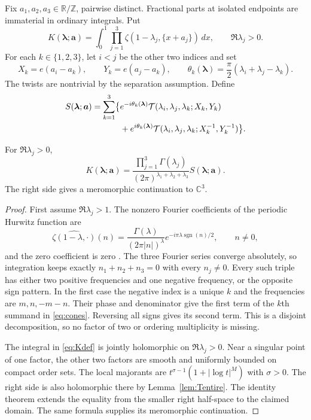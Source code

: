 Fix $a_1,a_2,a_3\in\mathbb R/\mathbb Z$, pairwise distinct.  Fractional
parts at isolated endpoints are immaterial in ordinary integrals.  Put
\begin{equation}\label{eq:Kdef}
 K(\boldsymbol\lambda;\boldsymbol a)
 =\int_0^1\prod_{j=1}^{3}
    \zeta(1-\lambda_j,\{x+a_j\})\,dx,
 \qquad \Re\lambda_j>0.
\end{equation}
For each $k\in\{1,2,3\}$, let $i<j$ be the other two indices and set
\[
 X_k=e(a_i-a_k),\qquad Y_k=e(a_j-a_k),\qquad
 \theta_k(\boldsymbol\lambda)=\frac\pi2(\lambda_i+\lambda_j-\lambda_k).
\]
The twists are nontrivial by the separation assumption.  Define
\begin{align}\label{eq:cones}
 S(\boldsymbol\lambda;\boldsymbol a)
 =\sum_{k=1}^{3}\bigl\{&e^{-i\theta_k(\boldsymbol\lambda)}
 \mathcal T(\lambda_i,\lambda_j,\lambda_k;X_k,Y_k)\notag\\
 &+e^{i\theta_k(\boldsymbol\lambda)}
 \mathcal T(\lambda_i,\lambda_j,\lambda_k;X_k^{-1},Y_k^{-1})\bigr\}.
\end{align}

\begin{theorem}\label{thm:sixcone}
For $\Re\lambda_j>0$,
\begin{equation}\label{eq:sixcone}
 K(\boldsymbol\lambda;\boldsymbol a)
 =\frac{\prod_{j=1}^{3}\Gamma(\lambda_j)}
 {(2\pi)^{\lambda_1+\lambda_2+\lambda_3}}
 S(\boldsymbol\lambda;\boldsymbol a).
\end{equation}
The right side gives a meromorphic continuation to $\mathbb C^3$.
\end{theorem}
\begin{proof}
First assume $\Re\lambda_j>1$.  The nonzero Fourier coefficients of the
periodic Hurwitz function are
\begin{equation}\label{eq:hurwitz-fourier-lambda}
 \widehat{\zeta(1-\lambda,\cdot)}(n)
 =\frac{\Gamma(\lambda)}{(2\pi |n|)^\lambda}
    e^{-i\pi\lambda\operatorname{sgn}(n)/2},\qquad n\ne0,
\end{equation}
and the zero coefficient is zero \cite[Eq.~25.11.9]{dlmf-hurwitz}.
The three Fourier series converge absolutely, so integration keeps
exactly $n_1+n_2+n_3=0$ with every $n_j\ne0$.  Every such triple has either
two positive frequencies and one negative frequency, or the opposite
sign pattern.  In the first case the negative index is a unique $k$ and
the frequencies are $m,n,-m-n$.  Their phase and denominator give the
first term of the $k$th summand in \eqref{eq:cones}.  Reversing all signs
gives its second term.  This is a disjoint decomposition, so no factor
of two or ordering multiplicity is missing.

The integral in \eqref{eq:Kdef} is jointly holomorphic on
$\Re\lambda_j>0$.  Near a singular point of one factor, the other two
factors are smooth and uniformly bounded on compact order sets.  The
local majorants are $t^{\sigma-1}(1+|\log t|^M)$ with $\sigma>0$.
The right side is also holomorphic there by Lemma~\ref{lem:Tentire}.
The identity theorem extends the equality from the smaller right
half-space to the claimed domain.  The same formula supplies its
meromorphic continuation.
\end{proof}

